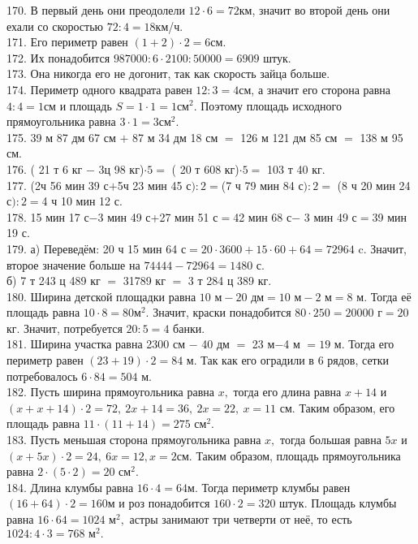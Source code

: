 170. В первый день они преодолели $12\cdot6=72$км, значит во второй день они ехали со скоростью $72:4=18$км/ч.\\
171. Его периметр равен $(1+2)\cdot2=6$см.\\
172. Их понадобится $987000:6\cdot2100:50000=6909$ штук.\\
173. Она никогда его не догонит, так как скорость зайца больше.\\
174. Периметр одного квадрата равен $12:3=4$см, а значит его сторона равна $4:4=1$см и площадь $S=1\cdot1=1\text{см}^2.$ Поэтому площадь исходного прямоугольника равна $3\cdot1=3\text{см}^2.$\\
175. 39 м 87 дм 67 см $+$ 87 м 34 дм 18 см $=$ 126 м 121 дм 85 см $=$ 138 м 95 см.\\
176. ( 21 т 6 кг $-$ 3ц 98 кг)$\cdot5=$ ( 20 т 608 кг)$\cdot5=$ 103 т 40 кг.\\
177. (2ч 56 мин 39 с$+$5ч 23 мин 45 с$):2=$(7 ч 79 мин 84 с$):2=$ (8 ч 20 мин 24 с$):2=$4 ч 10 мин 12 с.\\
178. 15 мин 17 с$-$3 мин 49 с+27 мин 51 с$=$42 мин 68 с$-$ 3 мин 49 с$=$39 мин 19 с.\\
179. а) Переведём: 20 ч 15 мин 64 с$=20\cdot3600+15\cdot60+64=72964$ c. Значит, второе значение больше на $74444-72964=1480$ с.\\
б) 7 т 243 ц 489 кг $=$ 31789 кг $=$ 3 т 284 ц 389 кг.\\
180. Ширина детской площадки равна $10\text{ м}-20 \text{ дм}=10\text{ м}-2\text{ м}=8\text{ м}.$ Тогда её площадь равна $10\cdot8=80\text{м}^2.$ Значит, краски понадобится $80\cdot250=20000\text{ г}=20$кг. Значит, потребуется $20:5=4$ банки.\\
181. Ширина участка равна 2300 см $-$ 40 дм $=$ 23 м$-$4 м $=19$ м. Тогда его периметр равен $(23+19)\cdot2=84$ м. Так как его оградили в 6 рядов, сетки потребовалось $6\cdot84=504$ м.\\
182. Пусть ширина прямоугольника равна $x,$ тогда его длина равна $x+14$ и $(x+x+14)\cdot2=72,\ 2x+14=36,\ 2x=22,\ x=11$ см. Таким образом, его площадь равна $11\cdot(11+14)=275\text{ см}^2.$\\
183. Пусть меньшая сторона прямоугольника равна $x,$ тогда большая равна $5x$ и $(x+5x)\cdot2=24,\ 6x=12, x=2$см. Таким образом, площадь прямоугольника равна $2\cdot(5\cdot2)=20\text{ см}^2.$\\
184. Длина клумбы равна $16\cdot4=64$м. Тогда периметр клумбы равен $(16+64)\cdot2=160$м и роз понадобится $160\cdot2=320$ штук. Площадь клумбы равна $16\cdot64=1024\text{ м}^2,$ астры занимают три четверти от неё, то есть $1024:4\cdot3=768\text{ м}^2.$\\
